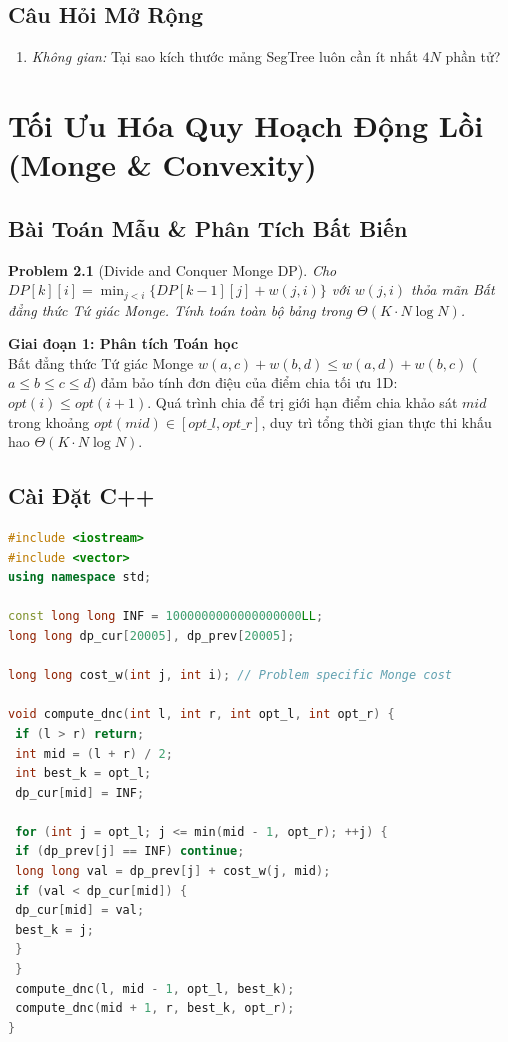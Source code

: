 \documentclass[11pt, letterpaper]{report}
\newtheorem{baitoan}{Problem}[chapter]
\begin{document}
\section{Câu Hỏi Mở Rộng}
\begin{enumerate}
 \item \textit{Không gian:} Tại sao kích thước mảng SegTree luôn cần ít nhất $4N$ phần tử?
\end{enumerate}

\chapter{Tối Ưu Hóa Quy Hoạch Động Lồi (Monge \& Convexity)}
\label{mod:monge_dp}

\section{Bài Toán Mẫu \& Phân Tích Bất Biến}
\begin{baitoan}[Divide and Conquer Monge DP]
Cho $DP[k][i] = \min_{j < i} \{ DP[k-1][j] + w(j, i) \}$ với $w(j, i)$ thỏa mãn Bất đẳng thức Tứ giác Monge. Tính toán toàn bộ bảng trong $\Theta(K \cdot N \log N)$.
\end{baitoan}

\noindent\textbf{Giai đoạn 1: Phân tích Toán học}\\
Bất đẳng thức Tứ giác Monge $w(a, c) + w(b, d) \le w(a, d) + w(b, c)$ ($a \le b \le c \le d$) đảm bảo tính đơn điệu của điểm chia tối ưu 1D: $opt(i) \le opt(i+1)$. Quá trình chia để trị giới hạn điểm chia khảo sát $mid$ trong khoảng $opt(mid) \in [opt\_l, opt\_r]$, duy trì tổng thời gian thực thi khấu hao $\Theta(K \cdot N \log N)$.

\section{Cài Đặt C++}
\begin{lstlisting}[language=C++, caption={C++ Divide \& Conquer Monge DP Optimizer}]
#include <iostream>
#include <vector>
using namespace std;

const long long INF = 1000000000000000000LL;
long long dp_cur[20005], dp_prev[20005];

long long cost_w(int j, int i); // Problem specific Monge cost

void compute_dnc(int l, int r, int opt_l, int opt_r) {
 if (l > r) return;
 int mid = (l + r) / 2;
 int best_k = opt_l;
 dp_cur[mid] = INF;
 
 for (int j = opt_l; j <= min(mid - 1, opt_r); ++j) {
 if (dp_prev[j] == INF) continue;
 long long val = dp_prev[j] + cost_w(j, mid);
 if (val < dp_cur[mid]) {
 dp_cur[mid] = val;
 best_k = j;
 }
 }
 compute_dnc(l, mid - 1, opt_l, best_k);
 compute_dnc(mid + 1, r, best_k, opt_r);
}
\end{lstlisting}
\end{document}
